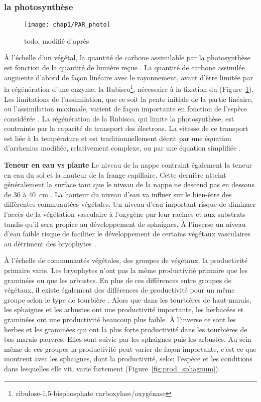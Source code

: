 \subsubsection{la photosynthèse}

\begin{figure}
\centering
\texttt{[image: chap1/PAR\_photo]}
\caption{todo, modifié d'après \citet{long1993}}
\label{fig:PAR_photo}
\end{figure}

À l'échelle d'un végétal, la quantité de carbone assimilable par la photosynthèse est fonction de la quantité de lumière reçue \citep{long1993}.
La quantité de carbone assimilée augmente d'abord de façon linéaire avec le rayonnement, avant d'être limitée par la régénération d'une enzyme, la Rubisco\footnote{ribulose-1,5-bisphosphate carboxylase/oxygénase}, nécessaire à la fixation du \coo (Figure~\ref{fig:PAR_photo}).
Les limitations de l'assimilation, que ce soit la pente initiale de la partie linéaire, ou l'assimilation maximale, varient de façon importante en fonction de l'espèce considérée \citep{wullschleger1993}.
La régénération de la Rubisco, qui limite la photosynthèse, est contrainte par la capacité de transport des électrons.
La vitesse de ce transport est liée à la température et est traditionnellement décrit par une équation d'arrhenius modifiée, relativement complexe, ou par une équation simplifiée \citep{farquhar1980,june2004}.

\textbf{Teneur en eau vs plante}
Le niveau de la nappe contraint également la teneur en eau du sol et la hauteur de la frange capillaire.
Cette dernière atteint généralement la surface tant que le niveau de la nappe ne descend pas en dessous de \num{30} à \SI{40}{\centi\metre} \citep{laiho2006}.
La hauteur du niveau d'eau va influer sur le bien-être des différentes commuautées végétales.
Un niveau d'eau important risque de diminuer l'accès de la végétation vasculaire à l'oxygène par leur racines et aux substrats tandis qu'il sera propice au développement de sphaignes.
À l'inverse un niveau d'eau faible risque de faciliter le développement de certains végétaux vasculaires au détriment des bryophytes \plop.

À l'échelle de communautés végétales, des groupes de végétaux, la productivité primaire varie.
Les bryophytes n'ont pas la même productivité primaire que les graminées ou que les arbustes.
En plus de ces différences entre groupes de végétaux, il existe également des différences de productivité pour un même groupe selon le type de tourbière \citetext{\citealp{moore2002} dans \citealp{rydin2013b}}.
Alors que dans les tourbières de haut-marais, les sphaignes et les arbustes ont une productivité importante, les herbacées et graminées ont une productivité beaucoup plus faible.
À l'inverse ce sont les herbes et les graminées qui ont la plus forte productivité dans les tourbières de bas-marais pauvres.
Elles sont suivie par les sphaignes puis les arbustes.
Au sein même de ces groupes la productivité peut varier de façon importante, c'est ce que montrent \citet{gunnarsson2005} avec les sphaignes, dont la productivité, selon l'espèce et les conditions dans lesquelles elle vit, varie fortement (Figure~\ref{fig:prod_sphagnum}).

